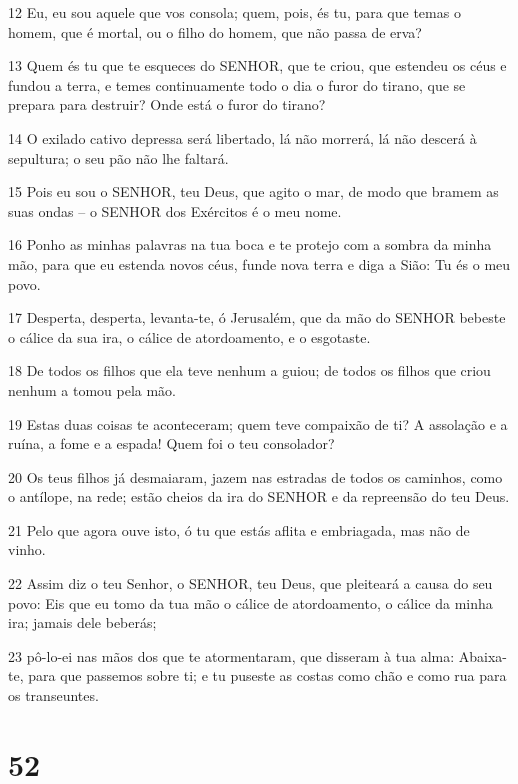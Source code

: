 \par 12 Eu, eu sou aquele que vos consola; quem, pois, és tu, para que temas o homem, que é mortal, ou o filho do homem, que não passa de erva?
\par 13 Quem és tu que te esqueces do SENHOR, que te criou, que estendeu os céus e fundou a terra, e temes continuamente todo o dia o furor do tirano, que se prepara para destruir? Onde está o furor do tirano?
\par 14 O exilado cativo depressa será libertado, lá não morrerá, lá não descerá à sepultura; o seu pão não lhe faltará.
\par 15 Pois eu sou o SENHOR, teu Deus, que agito o mar, de modo que bramem as suas ondas -- o SENHOR dos Exércitos é o meu nome.
\par 16 Ponho as minhas palavras na tua boca e te protejo com a sombra da minha mão, para que eu estenda novos céus, funde nova terra e diga a Sião: Tu és o meu povo.
\par 17 Desperta, desperta, levanta-te, ó Jerusalém, que da mão do SENHOR bebeste o cálice da sua ira, o cálice de atordoamento, e o esgotaste.
\par 18 De todos os filhos que ela teve nenhum a guiou; de todos os filhos que criou nenhum a tomou pela mão.
\par 19 Estas duas coisas te aconteceram; quem teve compaixão de ti? A assolação e a ruína, a fome e a espada! Quem foi o teu consolador?
\par 20 Os teus filhos já desmaiaram, jazem nas estradas de todos os caminhos, como o antílope, na rede; estão cheios da ira do SENHOR e da repreensão do teu Deus.
\par 21 Pelo que agora ouve isto, ó tu que estás aflita e embriagada, mas não de vinho.
\par 22 Assim diz o teu Senhor, o SENHOR, teu Deus, que pleiteará a causa do seu povo: Eis que eu tomo da tua mão o cálice de atordoamento, o cálice da minha ira; jamais dele beberás;
\par 23 pô-lo-ei nas mãos dos que te atormentaram, que disseram à tua alma: Abaixa-te, para que passemos sobre ti; e tu puseste as costas como chão e como rua para os transeuntes.

\chapter{52}

